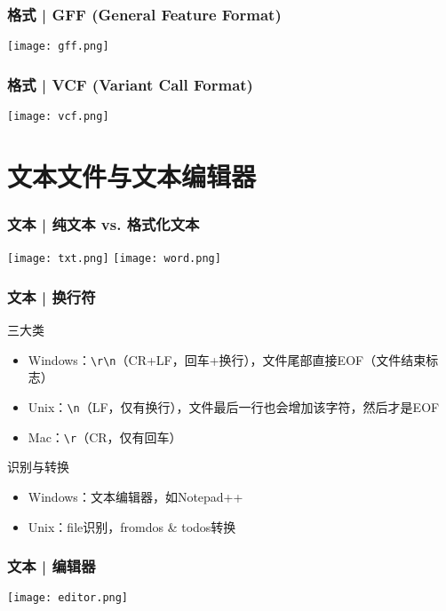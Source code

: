 \begin{frame}
  \frametitle{格式 | GFF (General Feature Format)}
    \begin{center}
      \texttt{[image: gff.png]}
    \end{center}
\end{frame}

\begin{frame}
  \frametitle{格式 | VCF (Variant Call Format)}
    \begin{center}
      \texttt{[image: vcf.png]}
    \end{center}
\end{frame}

\section{文本文件与文本编辑器}
\begin{frame}
  \frametitle{文本 | 纯文本 vs. 格式化文本}
    \begin{center}
      \texttt{[image: txt.png]}
      \vspace*{0.1cm}
      \texttt{[image: word.png]}
    \end{center}
\end{frame}

\begin{frame}[fragile]
  \frametitle{文本 | 换行符}
  \begin{block}{三大类}
    \begin{itemize}
      \item Windows：\verb|\r\n|（CR+LF，回车+换行），文件尾部直接EOF（文件结束标志）
      \item Unix：\verb|\n|（LF，仅有换行），文件最后一行也会增加该字符，然后才是EOF
      \item Mac：\verb|\r|（CR，仅有回车）
    \end{itemize}
  \end{block}
  \pause
  \begin{block}{识别与转换}
    \begin{itemize}
      \item Windows：文本编辑器，如Notepad++
      \item Unix：file识别，fromdos \& todos转换
    \end{itemize}
  \end{block}
\end{frame}

\begin{frame}
  \frametitle{文本 | 编辑器}
    \begin{center}
      \texttt{[image: editor.png]}
    \end{center}
\end{frame}

